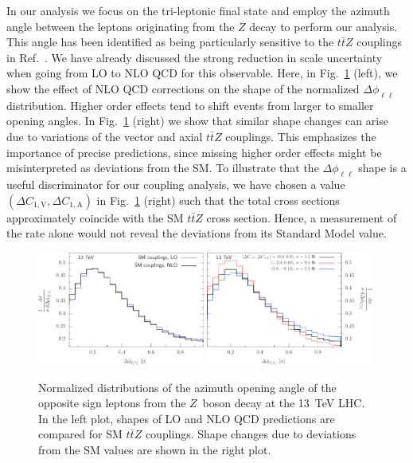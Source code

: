 \documentclass{JHEP3}
\def\ttbZ{t\bar{t}Z}
\def\DConeA{\Delta C_{1,\mathrm{A}}}
\def\DConeV{\Delta C_{1,\mathrm{V}}}
\begin{document}
In our analysis we focus on the tri-leptonic final state and employ the azimuth angle between the leptons originating
from the $Z$ decay to perform our analysis.
This angle has been identified as being particularly sensitive to the $\ttbZ$ couplings in Ref.~\cite{Baur:2004uw}.
We have already discussed the strong reduction in scale uncertainty when going from LO to NLO QCD for this observable.
Here, in Fig.~\ref{fig:vi} (left), we show the effect of NLO QCD corrections on the shape of the normalized $\Delta \phi_{\ell\ell}$ distribution.
Higher order effects tend to shift events from larger to smaller opening angles.
In Fig.~\ref{fig:vi} (right) we show that similar shape changes can arise due to variations of the vector and axial $\ttbZ$ couplings.
This emphasizes the importance of precise predictions, since missing higher order effects might be misinterpreted as deviations from the SM.
To illustrate that the $\Delta \phi_{\ell\ell}$ shape is a useful discriminator for our coupling analysis, we have chosen 
a value $(\DConeV,\DConeA)$ in Fig.~\ref{fig:vi} (right) such that the total cross sections approximately coincide with the SM $\ttbZ$ cross section.
Hence, a measurement of the rate alone would not reveal the deviations from its Standard Model value.\\
 


\begin{figure}[t]
\centering 
\includegraphics[width=0.49\textwidth]{./LHC_53_Fig17a.pdf}
\hfill
\includegraphics[width=0.49\textwidth]{./LHC_53_Fig17b.pdf}
\caption{\label{fig:vi}
Normalized distributions of the azimuth opening angle of the opposite sign leptons from the $Z$~boson decay at the 13~TeV LHC.
In the left plot, shapes of LO and NLO QCD predictions are compared for SM $\ttbZ$ couplings.
Shape changes due to deviations from the SM values are shown in the right plot.
}
\end{figure}
\end{document}
